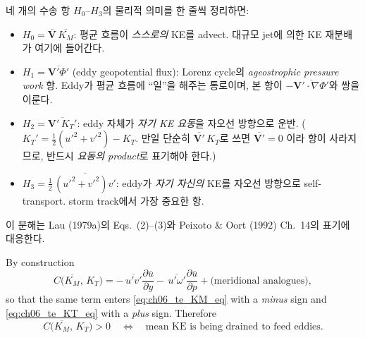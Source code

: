 \begin{hisublock}
네 개의 수송 항 $H_0$--$H_3$의 물리적 의미를 한 줄씩 정리하면:
\begin{itemize}
  \item $H_0 = \overline{\mathbf{V}}\,\overline{K_M}$:
        평균 흐름이 \emph{스스로의} KE를 advect.
        대규모 jet에 의한 KE 재분배가 여기에 들어간다.
  \item $H_1 = \overline{\mathbf{V}'\Phi'}$ (eddy geopotential flux):
        Lorenz cycle의 \emph{ageostrophic pressure work} 항.
        Eddy가 평균 흐름에 ``일''을 해주는 통로이며, 본 항이
        $-\overline{\mathbf{V}'\cdot\nabla\Phi'}$와 쌍을 이룬다.
  \item $H_2 = \overline{\mathbf{V}'\,K_T'}$:
        eddy 자체가 \emph{자기 KE 요동}을 자오선 방향으로 운반.
        ($K_T' = \tfrac{1}{2}(u'^2+v'^2) - K_T$.
        만일 단순히 $\overline{\mathbf{V}'}\,K_T$로 쓰면 $\overline{\mathbf{V}'}=0$
        이라 항이 사라지므로, 반드시 \emph{요동의 product}로 표기해야 한다.)
  \item $H_3 = \tfrac{1}{2}\,\overline{(u'^2+v'^2)v'}$:
        eddy가 \emph{자기 자신의} KE를 자오선 방향으로 self-transport.
        storm track에서 가장 중요한 항.
\end{itemize}
이 분해는 Lau (1979a)의 Eqs.~(2)--(3)와 Peixoto \& Oort (1992) Ch.~14의
표기에 대응한다.
\end{hisublock}

\begin{remark}
\label{rem:ch06_te_CKMKT_sign}
By construction
\[
  C\!\bigl(\overline{K_M},\,K_T\bigr)
  = -\,\overline{u'v'}\frac{\partial \overline{u}}{\partial y}
    -\,\overline{u'\omega'}\frac{\partial \overline{u}}{\partial p}
    + \text{(meridional analogues)},
\]
so that the same term enters \eqref{eq:ch06_te_KM_eq} with a \emph{minus}
sign and \eqref{eq:ch06_te_KT_eq} with a \emph{plus} sign.  Therefore
\[
  C\!\bigl(\overline{K_M},\,K_T\bigr) > 0
  \quad\Longleftrightarrow\quad
  \text{mean KE is being drained to feed eddies.}
\]
\end{remark}


